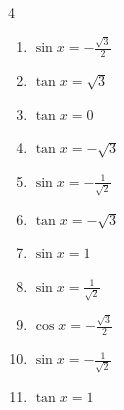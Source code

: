 \begin{multicols}{4}
\begin{enumerate}

  \item $\displaystyle \sin{x}  = -\frac{\sqrt{3}}{2}$


  \item $\displaystyle \tan{x}  = \sqrt{3}$


  \item $\displaystyle \tan{x}  = 0$


\columnbreak %

  \item $\displaystyle \tan{x}  = -\sqrt{3}$


  \item $\displaystyle \sin{x}  = -\frac{1}{\sqrt{2}}$


  \item $\displaystyle \tan{x}  = -\sqrt{3}$


  \item $\displaystyle \sin{x}  = 1$


  \item $\displaystyle \sin{x}  = \frac{1}{\sqrt{2}}$


  \item $\displaystyle \cos{x}  = -\frac{\sqrt{3}}{2}$


  \item $\displaystyle \sin{x}  = -\frac{1}{\sqrt{2}}$


  \item $\displaystyle \tan{x}  = 1$


\end{enumerate}
\end{multicols}
